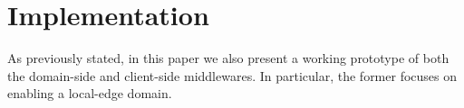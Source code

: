 \section{Implementation}\label{sec:implementation}

As previously stated, in this paper we also present a working prototype of both the domain-side and client-side middlewares. In particular, the former focuses on enabling a local-edge domain.



